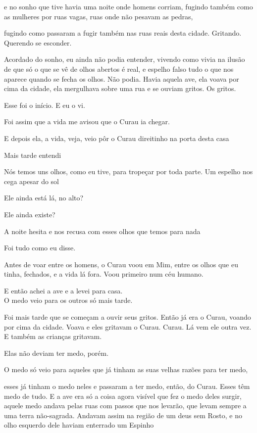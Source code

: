 e no sonho que tive havia uma noite onde homens corriam, fugindo também
como as mulheres por ruas vagas, ruas onde não pesavam as pedras,

fugindo como passaram a fugir também nas ruas reais desta cidade.
Gritando. Querendo se esconder.

Acordado do sonho, eu ainda não podia entender, vivendo como vivia na
ilusão de que só o que se vê de olhos abertos é real, e espelho falso
tudo o que nos aparece quando se fecha os olhos. Não podia. Havia aquela
ave, ela voava por cima da cidade, ela mergulhava sobre uma rua e se
ouviam gritos. Os gritos.

Esse foi o início. E eu o vi.

Foi assim que a vida me avisou que o Curau ia chegar.

E depois ela, a vida, veja, veio pôr o Curau direitinho na porta desta
casa

Mais tarde entendi

Nós temos uns olhos, como eu tive, para tropeçar por toda parte. Um
espelho nos cega apesar do sol

Ele ainda está lá, no alto?

Ele ainda existe?

A noite hesita e nos recusa com esses olhos que temos para nada

Foi tudo como eu disse.

Antes de voar entre os homens, o Curau voou em Mim, entre os olhos que
eu tinha, fechados, e a vida lá fora. Voou primeiro num céu humano.

E então achei a ave e a levei para casa.\\

O medo veio para os outros só mais tarde.

Foi mais tarde que se começam a ouvir seus gritos. Então já era o Curau,
voando por cima da cidade. Voava e eles gritavam o Curau. Curau. Lá vem
ele outra vez. E também as crianças gritavam.

Elas não deviam ter medo, porém.

O medo só veio para aqueles que já tinham as suas velhas razões para ter
medo,

esses já tinham o medo neles e passaram a ter medo, então, do Curau.
Esses têm medo de tudo. E a ave era só a coisa agora visível que fez o
medo deles surgir, aquele medo andava pelas ruas com passos que nos
levarão, que levam sempre a uma terra não-sagrada. Andavam assim na
região de um deus sem Rosto, e no olho esquerdo dele haviam enterrado um
Espinho

